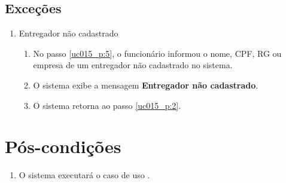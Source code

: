 \subsection{Exceções}

\begin{enumerate}[label=E\arabic*]
	\item Entregador não cadastrado \label{uc015_e:1}
	\begin{enumerate}[label*=.\arabic*]
		\item[] No passo \ref{uc015_p:5}, o funcionário informou o nome, CPF, RG ou empresa de um entregador não cadastrado no sistema.
		\item O sistema exibe a mensagem \textbf{Entregador não cadastrado}.
		\item O sistema retorna ao passo \ref{uc015_p:2}.
	\end{enumerate}
\end{enumerate}

\section{Pós-condições}

\begin{enumerate}
	\item O sistema executará o caso de uso .	
\end{enumerate}